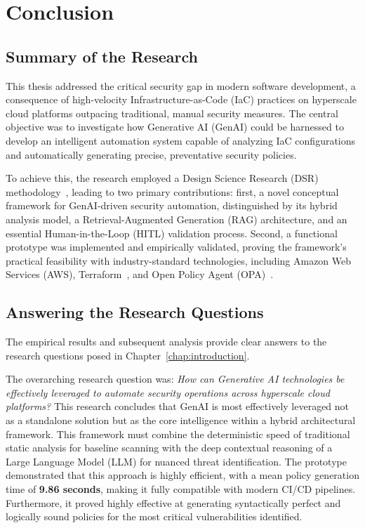 
\chapter{Conclusion} %
\label{chap:conclusion} %

\section{Summary of the Research}

This thesis addressed the critical security gap in modern software development, a consequence of high-velocity Infrastructure-as-Code (IaC) practices on hyperscale cloud platforms outpacing traditional, manual security measures. The central objective was to investigate how Generative AI (GenAI) could be harnessed to develop an intelligent automation system capable of analyzing IaC configurations and automatically generating precise, preventative security policies.

To achieve this, the research employed a Design Science Research (DSR) methodology~\cite{hevner_design_2004}, leading to two primary contributions: first, a novel conceptual framework for GenAI-driven security automation, distinguished by its hybrid analysis model, a Retrieval-Augmented Generation (RAG) architecture, and an essential Human-in-the-Loop (HITL) validation process. Second, a functional prototype was implemented and empirically validated, proving the framework's practical feasibility with industry-standard technologies, including Amazon Web Services (AWS), Terraform~\cite{howard_terraform_2022}, and Open Policy Agent (OPA)~\cite{the_opa_authors_open_2025}.

\section{Answering the Research Questions}

The empirical results and subsequent analysis provide clear answers to the research questions posed in Chapter~\ref{chap:introduction}.

The overarching research question was: \textit{How can Generative AI technologies be effectively leveraged to automate security operations across hyperscale cloud platforms?}
This research concludes that GenAI is most effectively leveraged not as a standalone solution but as the core intelligence within a hybrid architectural framework. This framework must combine the deterministic speed of traditional static analysis for baseline scanning with the deep contextual reasoning of a Large Language Model (LLM) for nuanced threat identification. The prototype demonstrated that this approach is highly efficient, with a mean policy generation time of \textbf{9.86 seconds}, making it fully compatible with modern CI/CD pipelines. Furthermore, it proved highly effective at generating syntactically perfect and logically sound policies for the most critical vulnerabilities identified.


